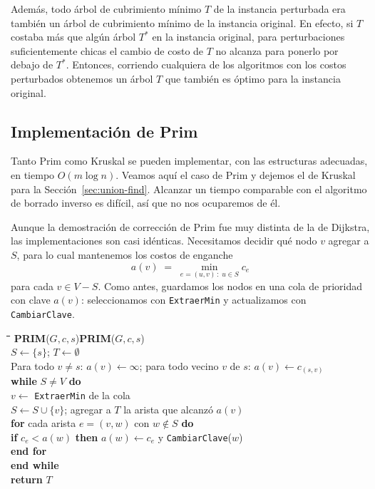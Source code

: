 \documentclass[12pt, spanish, oneside, openany]{book}
\newcommand{\pl}[1]{\makebox[1.6em][r]{\texttt{\footnotesize #1}}\hspace{0.9em}}
\newenvironment{pseudo}[1]{%
  \begin{center}%
  \begin{mdframed}[style=pseudobox]%
  \small
  \begin{tabbing}%
  \hspace{2.5em}\=\hspace{1.5em}\=\hspace{1.5em}\=\hspace{1.5em}\=\hspace{1.5em}\=\kill
  \def\pseudotitulo{#1}\ifx\pseudotitulo\empty\else#1\\[3pt]\fi}%
  {\end{tabbing}\end{mdframed}\end{center}}
\theoremstyle{uprightplain}
\theoremstyle{definition}
\theoremstyle{remark}
\theoremstyle{definition}
\begin{document}
Además, todo árbol de cubrimiento mínimo $T$ de la instancia perturbada era también un árbol de cubrimiento mínimo de la instancia original. En efecto, si $T$ costaba más que algún árbol $T^*$ en la instancia original, para perturbaciones suficientemente chicas el cambio de costo de $T$ no alcanza para ponerlo por debajo de $T^*$. Entonces, corriendo cualquiera de los algoritmos con los costos perturbados obtenemos un árbol $T$ que también es óptimo para la instancia original.

\subsection{Implementación de Prim}

Tanto Prim como Kruskal se pueden implementar, con las estructuras adecuadas, en tiempo $O(m\log n)$. Veamos aquí el caso de Prim y dejemos el de Kruskal para la Sección~\ref{sec:union-find}. Alcanzar un tiempo comparable con el algoritmo de borrado inverso es difícil, así que no nos ocuparemos de él.

Aunque la demostración de corrección de Prim fue muy distinta de la de Dijkstra, las implementaciones son casi idénticas. Necesitamos decidir qué nodo $v$ agregar a $S$, para lo cual mantenemos los costos de enganche
\[
a(v) \;=\; \min_{e=(u,v)\,:\;u\in S} c_e
\]
para cada $v \in V-S$. Como antes, guardamos los nodos en una cola de prioridad con clave $a(v)$: seleccionamos con \texttt{ExtraerMin} y actualizamos con \texttt{CambiarClave}.

\begin{pseudo}{\textbf{PRIM}($G,c,s$)}
\pl{1}\> $S \leftarrow \{s\}$; \quad $T \leftarrow \emptyset$\\
\pl{2}\> Para todo $v \neq s$: $a(v) \leftarrow \infty$; \; para todo vecino $v$ de $s$: $a(v) \leftarrow c_{(s,v)}$\\
\pl{3}\> \textbf{while} $S \neq V$ \textbf{do}\\
\pl{4}\>\> $v \leftarrow$ \texttt{ExtraerMin} de la cola\\
\pl{5}\>\> $S \leftarrow S \cup \{v\}$; \quad agregar a $T$ la arista que alcanzó $a(v)$\\
\pl{6}\>\> \textbf{for} cada arista $e=(v,w)$ con $w \notin S$ \textbf{do}\\
\pl{7}\>\>\> \textbf{if} $c_e < a(w)$ \textbf{then} $a(w) \leftarrow c_e$ y \texttt{CambiarClave}($w$)\\
\pl{8}\>\> \textbf{end for}\\
\pl{9}\> \textbf{end while}\\
\pl{10}\> \textbf{return} $T$
\end{pseudo}
\end{document}
